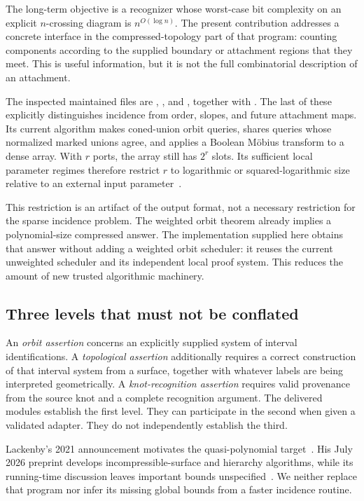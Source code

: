 \documentclass[11pt,letterpaper]{article}
\theoremstyle{definition}\newtheorem{definition}[theorem]{Definition}
\theoremstyle{remark}\newtheorem{remark}[theorem]{Remark}
\begin{document}
The long-term objective is a recognizer whose worst-case bit complexity on an explicit $n$-crossing diagram is $n^{O(\log n)}$. The present contribution addresses a concrete interface in the compressed-topology part of that program: counting components according to the supplied boundary or attachment regions that they meet. This is useful information, but it is not the full combinatorial description of an attachment.

The inspected maintained files are , , and , together with . The last of these explicitly distinguishes incidence from order, slopes, and future attachment maps. Its current algorithm makes coned-union orbit queries, shares queries whose normalized marked unions agree, and applies a Boolean M\"obius transform to a dense array. With $r$ ports, the array still has $2^r$ slots. Its sufficient local parameter regimes therefore restrict $r$ to logarithmic or squared-logarithmic size relative to an external input parameter~\cite{repo}.

This restriction is an artifact of the output format, not a necessary restriction for the sparse incidence problem. The weighted orbit theorem already implies a polynomial-size compressed answer. The implementation supplied here obtains that answer without adding a weighted orbit scheduler: it reuses the current unweighted scheduler and its independent local proof system. This reduces the amount of new trusted algorithmic machinery.

\subsection{Three levels that must not be conflated}

An \emph{orbit assertion} concerns an explicitly supplied system of interval identifications. A \emph{topological assertion} additionally requires a correct construction of that interval system from a surface, together with whatever labels are being interpreted geometrically. A \emph{knot-recognition assertion} requires valid provenance from the source knot and a complete recognition argument. The delivered modules establish the first level. They can participate in the second when given a validated adapter. They do not independently establish the third.

Lackenby's 2021 announcement motivates the quasi-polynomial target~\cite{announcement}. His July 2026 preprint develops incompressible-surface and hierarchy algorithms, while its running-time discussion leaves important bounds unspecified~\cite[Section~9]{lackenby}. We neither replace that program nor infer its missing global bounds from a faster incidence routine.
\end{document}
